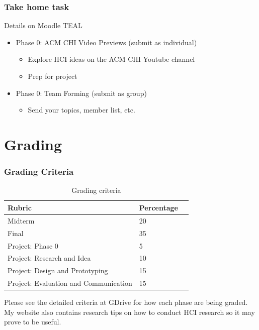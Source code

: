 \documentclass{beamer}
\begin{document}
\begin{frame}
\frametitle{Take home task}
Details on Moodle TEAL
\begin{itemize}
	\item Phase 0: ACM CHI Video Previews (submit as individual)
	\begin{itemize}
		\item Explore HCI ideas on the ACM CHI Youtube channel
		\item Prep for project 
	\end{itemize}
	\item Phase 0: Team Forming (submit as group)
	\begin{itemize}
		\item Send your topics, member list, etc. 
	\end{itemize}
\end{itemize}
\end{frame}

\section{Grading} %

\begin{frame}
\frametitle{Grading Criteria}
\begin{table}
	\begin{tabular}{l l l}
		\toprule
		\textbf{Rubric} & \textbf{Percentage} \\
		\midrule
		Midterm & 20 \\
		Final & 35 \\
  		Project: Phase 0 & 5 \\
		Project: Research and Idea & 10 \\
		Project: Design and Prototyping & 15 \\
		Project: Evaluation and Communication & 15 \\
		\bottomrule
	\end{tabular}
	\caption{Grading criteria}
\end{table}
Please see the detailed criteria at GDrive for how each phase are being graded.  My website also contains research tips on how to conduct HCI research so it may prove to be useful.
\end{frame}
\end{document}
